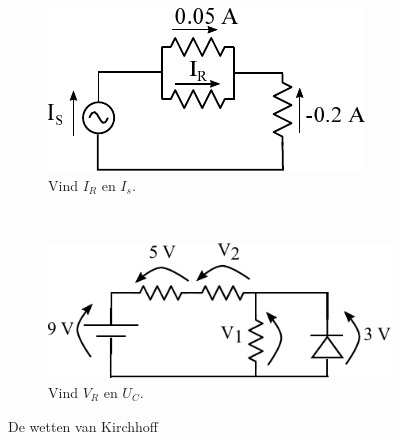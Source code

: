 \documentclass{article}
\begin{document}
			\begin{figure}[h!]
				\centering
				\begin{subfigure}[b]{0.45\linewidth}
					\centering
					\includegraphics{kcl_oef.pdf}
					\caption{Vind $I_R$ en $I_s$.}
					\label{subfig:kcl_oef}
				\end{subfigure}
				~
				\begin{subfigure}[b]{0.45\linewidth}
					\centering
					\includegraphics[width=\linewidth]{kvl_oef.pdf}
					\caption{Vind $V_R$ en $U_C$. }
					\label{subfig:kvl_oef}
				\end{subfigure}
			\caption{De wetten van Kirchhoff}
			\label{fig:kirchoff_oef}
			\end{figure}
\end{document}
